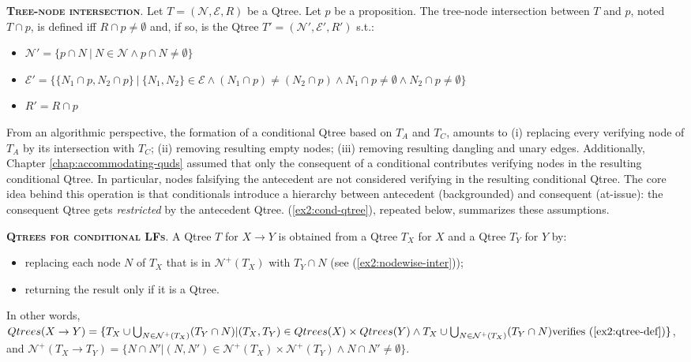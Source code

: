 \begin{exe}
	 {\textsc{\textbf{Tree-node intersection}}. Let $T=(\mathcal{N}, \mathcal{E}, R)$ be a Qtree. Let $p$ be a proposition. The tree-node intersection between $T$ and $p$, noted $T \cap p$, is defined iff $R \cap p \neq \emptyset$ and, if so, is the Qtree $T'=(\mathcal{N}', \mathcal{E}', R')$ s.t.:
		\begin{itemize}
			\item $\mathcal{N}' = \lbrace p \cap N \ | \ N \in \mathcal{N} \wedge p \cap N \neq \emptyset\rbrace$
			\item $\mathcal{E}' = \lbrace \lbrace N_1\cap p, N_2\cap p\rbrace \ | \ \lbrace N_1, N_2\rbrace \in \mathcal{E} \wedge (N_1\cap p) \neq (N_2\cap p) \wedge N_1\cap p \neq \emptyset \wedge N_2\cap p \neq \emptyset \rbrace$
			\item $R' = R\cap p$
	\end{itemize}}
\end{exe} 

From an algorithmic perspective, the formation of a conditional Qtree based on $T_A$ and $T_C$, amounts to (i) replacing every verifying node of $T_A$ by its intersection with $T_C$; (ii) removing resulting empty nodes; (iii) removing resulting dangling and unary edges. Additionally, Chapter \ref{chap:accommodating-quds} assumed that only the consequent of a conditional contributes verifying nodes in the resulting conditional Qtree. In particular, nodes falsifying the antecedent are not considered verifying in the resulting conditional Qtree. The core idea behind this operation is that conditionals introduce a hierarchy between antecedent (backgrounded) and consequent (at-issue): the consequent Qtree gets \textit{restricted} by the antecedent Qtree. (\ref{ex2:cond-qtree}), repeated below, summarizes these assumptions.

\begin{exe}
	 {\textsc{\textbf{Qtrees for conditional LFs}}. A Qtree $T$ for $X \rightarrow Y$ is obtained from a Qtree $T_X$ for $X$ and a Qtree $T_Y$ for $Y$ by:
		\begin{itemize}
			\item replacing each node $N$ of $T_X$ that is in $\mathcal{N}^+(T_X)$ with $T_Y \cap N$ (see (\ref{ex2:nodewise-inter}));
			\item returning the result only if it is a Qtree.
		\end{itemize}
		In other words, $Qtrees(X \rightarrow Y) = \lbrace T_X \cup \bigcup_{N\in \mathcal{N}^+(T_X)}(T_Y \cap N) | (T_X, T_Y) \in Qtrees(X) \times Qtrees(Y) \wedge T_X \cup \bigcup_{N\in \mathcal{N}^+(T_X)}(T_Y \cap N) \text{verifies (\ref{ex2:qtree-def})}  \rbrace$, and $\mathcal{N}^+(T_X \rightarrow T_Y) = \lbrace N \cap N' | (N, N') \in \mathcal{N}^+(T_X) \times \mathcal{N}^+(T_Y) \wedge N \cap N' \neq \emptyset \rbrace$.}
\end{exe}

